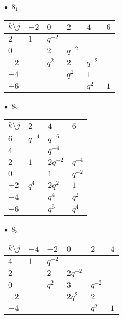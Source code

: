 %
\begin{minipage}{\linewidth}
$\bullet\ $ $8_{1}$ \vspace{0.5em} \\
\begin{tabular}{l|lllll}
$k \setminus j$ & $-2$ & $0$ & $2$ & $4$ & $6$ \\
\hline
$2$ & $1$ & $q^{-2}$ &  &  &  \\
$0$ &  & $2$ & $q^{-2}$ &  &  \\
$-2$ &  & $q^{2}$ & $2$ & $q^{-2}$ &  \\
$-4$ &  &  & $q^{2}$ & $1$ &  \\
$-6$ &  &  &  & $q^{2}$ & $1$ \\
\end{tabular}
\vspace{2em}
\end{minipage}
%
\begin{minipage}{\linewidth}
$\bullet\ $ $8_{2}$ \vspace{0.5em} \\
\begin{tabular}{l|lll}
$k \setminus j$ & $2$ & $4$ & $6$ \\
\hline
$6$ & $q^{-4}$ & $q^{-6}$ &  \\
$4$ &  & $q^{-4}$ &  \\
$2$ & $1$ & $2q^{-2}$ & $q^{-4}$ \\
$0$ &  & $1$ & $q^{-2}$ \\
$-2$ & $q^{4}$ & $2q^{2}$ & $1$ \\
$-4$ &  & $q^{4}$ & $q^{2}$ \\
$-6$ &  & $q^{6}$ & $q^{4}$ \\
\end{tabular}
\vspace{2em}
\end{minipage}
%
\begin{minipage}{\linewidth}
$\bullet\ $ $8_{3}$ \vspace{0.5em} \\
\begin{tabular}{l|lllll}
$k \setminus j$ & $-4$ & $-2$ & $0$ & $2$ & $4$ \\
\hline
$4$ & $1$ & $q^{-2}$ &  &  &  \\
$2$ &  & $2$ & $2q^{-2}$ &  &  \\
$0$ &  & $q^{2}$ & $3$ & $q^{-2}$ &  \\
$-2$ &  &  & $2q^{2}$ & $2$ &  \\
$-4$ &  &  &  & $q^{2}$ & $1$ \\
\end{tabular}
\vspace{2em}
\end{minipage}

